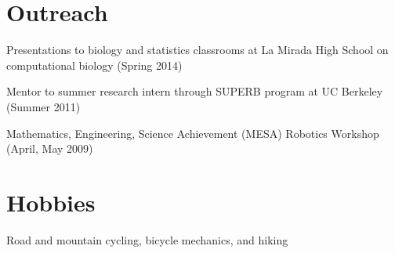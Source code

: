 \documentclass[margin,line]{res}
\begin{document}
\begin{resume}
\section{\sc Outreach}
Presentations to biology and statistics classrooms at La Mirada High School on
computational biology (Spring 2014)

Mentor to summer research intern through SUPERB program at UC Berkeley (Summer
2011)

Mathematics, Engineering, Science Achievement (MESA) Robotics Workshop
(April, May 2009)
\vspace{-.25cm}

\section{\sc Hobbies}
Road and mountain cycling, bicycle mechanics, and hiking
\end{resume}
\end{document}
